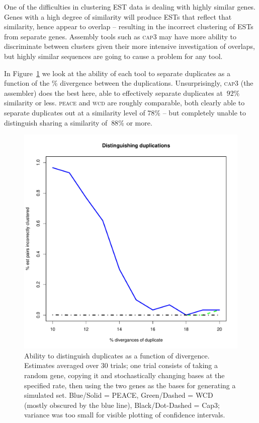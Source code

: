 \documentclass[a4paper,12pt]{article}
\newcommand{\peace} {{\small PEACE}}
\newcommand{\wcd} {{\small WCD}}
\newcommand{\capthree} {{\small Cap3}}
\begin{document}
\begin{appendix}
One of the difficulties in clustering EST data is dealing with
highly similar genes.  Genes with a high degree of similarity will
produce ESTs that reflect that similarity, hence appear to overlap --
resulting in the incorrect clustering of ESTs from separate genes.  Assembly tools
such as \textsc{cap3} may have more ability to discriminate between clusters
given their more intensive investigation of overlaps, but highly
similar sequences are going to cause a problem for any tool. 

In Figure~\ref{dups} we look at the ability of each tool to separate
duplicates as a function of the \% divergence between the
duplications.  Unsurprisingly, \textsc{cap3} (the assembler) does the best
here, able to effectively separate duplicates at $~92\%$ similarity
or less.  \textsc{peace} and \textsc{wcd} are roughly comparable, both clearly able to
separate duplicates out at a similarity level of $78\%$ -- but completely 
unable to distinguish sharing a similarity of $~88\%$ or more. 

\begin{figure}[tbp]
\centerline{
\includegraphics[scale=0.35]{pics.d/duplicates_40.pdf}
}
\caption{Ability to distinguish duplicates as a function of
  divergence.  Estimates averaged over 30 trials; one trial consists
  of taking a random gene, copying it and stochastically changing
  bases at the specified rate, then using the two genes as the bases
  for generating a simulated set. Blue/Solid = \peace, Green/Dashed =
  \wcd\/ (mostly obscured by the blue line), Black/Dot-Dashed =
  \capthree; variance was too small for visible plotting of
  confidence intervals.}\label{dups}
\end{figure}


\end{appendix}
\end{document}
